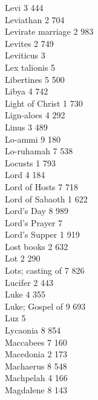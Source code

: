 Levi \hfill 3 \quad \phantom{0}444\\
Leviathan \hfill 2 \quad \phantom{0}704\\
Levirate marriage \hfill 2 \quad \phantom{0}983\\
Levites \hfill 2 \quad \phantom{0}749\\
Leviticus \hfill 3 \\
Lex talionis \hfill 5 \\
Libertines \hfill 5 \quad \phantom{0}500\\
Libya \hfill 4 \quad \phantom{0}742\\
Light of Christ \hfill 1 \quad \phantom{0}730\\
Lign-aloes \hfill 4 \quad \phantom{0}292\\
Linus \hfill 3 \quad \phantom{0}489\\
Lo-ammi \hfill 9 \quad \phantom{0}180\\
Lo-ruhamah \hfill 7 \quad \phantom{0}538\\
Locusts \hfill 1 \quad \phantom{0}793\\
Lord \hfill 4 \quad \phantom{0}184\\
Lord of Hosts \hfill 7 \quad \phantom{0}718\\
Lord of Sabaoth \hfill 1 \quad \phantom{0}622\\
Lord’s Day \hfill 8 \quad \phantom{0}989\\
Lord’s Prayer \hfill 7 \\
Lord’s Supper \hfill 1 \quad \phantom{0}919\\
Lost books \hfill 2 \quad \phantom{0}632\\
Lot \hfill 2 \quad \phantom{0}290\\
Lots; casting of \hfill 7 \quad \phantom{0}826\\
Lucifer \hfill 2 \quad \phantom{0}443\\
Luke \hfill 4 \quad \phantom{0}355\\
Luke; Gospel of \hfill 9 \quad \phantom{0}693\\
Luz \hfill 5 \\
Lycaonia \hfill 8 \quad \phantom{0}854\\
Maccabees \hfill 7 \quad \phantom{0}160\\
Macedonia \hfill 2 \quad \phantom{0}173\\
Machaerus \hfill 8 \quad \phantom{0}548\\
Machpelah \hfill 4 \quad \phantom{0}166\\
Magdalene \hfill 8 \quad \phantom{0}143\\

